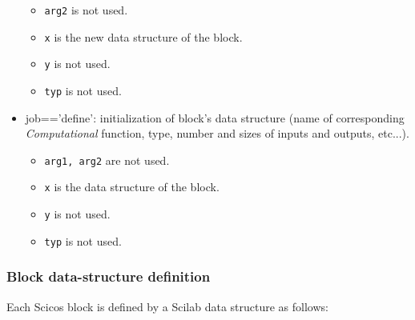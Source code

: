 \documentclass{article}
\newcommand{\computational}{{\em Computational }}
\begin{document}
\begin{itemize}
\begin{itemize}
  \item  {\tt arg2} is not used.
  \item {\tt x} is the new data structure of the block.
  \item {\tt y} is not used.
  \item {\tt typ} is not used.
  \end{itemize}
\item  job=='define': initialization of block's data
  structure (name of corresponding \computational function, type, 
  number and sizes of inputs and outputs, etc...).
  \begin{itemize}
  \item  {\tt arg1, arg2} are not used.
  \item {\tt x} is the data structure of the block.
  \item {\tt y} is not used.
  \item {\tt typ} is not used.
  \end{itemize}
\end{itemize}

\subsubsection{Block data-structure definition}
\label{bds}
Each Scicos block is defined by a Scilab data structure as
follows:
\end{document}
